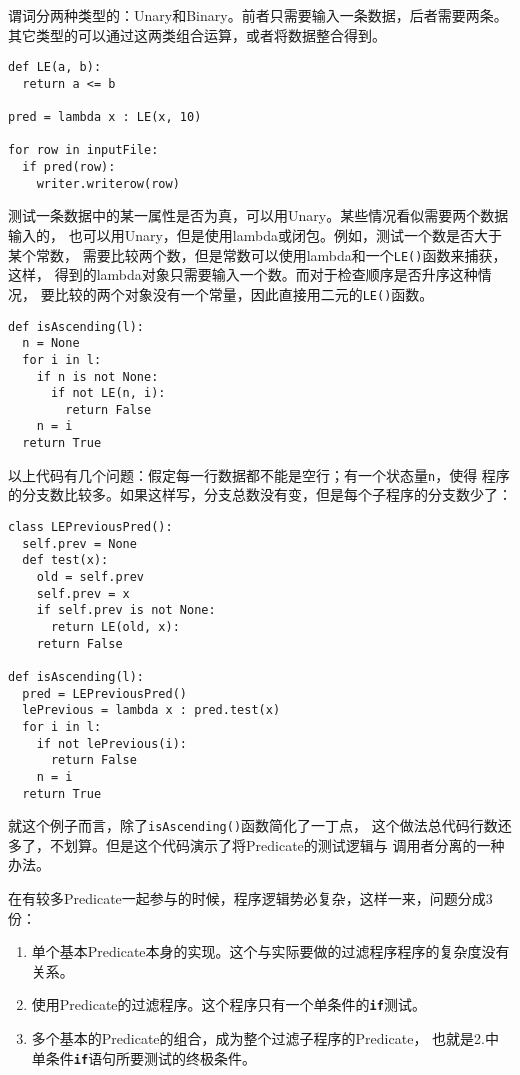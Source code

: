 \documentclass[11pt]{article}
\newcommand{\id}[1]{\texttt{#1}}
\newcommand{\kw}[1]{\texttt{\textbf{#1}}}
\begin{document}
谓词分两种类型的：Unary和Binary。前者只需要输入一条数据，后者需要两条。
其它类型的可以通过这两类组合运算，或者将数据整合得到。
\begin{lstlisting}
def LE(a, b):
  return a <= b

pred = lambda x : LE(x, 10)

for row in inputFile:
  if pred(row):
    writer.writerow(row)
\end{lstlisting}

测试一条数据中的某一属性是否为真，可以用Unary。某些情况看似需要两个数据输入的，
也可以用Unary，但是使用lambda或闭包。例如，测试一个数是否大于某个常数，
需要比较两个数，但是常数可以使用lambda和一个\id{LE()}函数来捕获，这样，
得到的lambda对象只需要输入一个数。而对于检查顺序是否升序这种情况，
要比较的两个对象没有一个常量，因此直接用二元的\id{LE()}函数。
\begin{lstlisting}
def isAscending(l):
  n = None
  for i in l:
    if n is not None:
      if not LE(n, i):
        return False
    n = i
  return True    
\end{lstlisting}

以上代码有几个问题：假定每一行数据都不能是空行；有一个状态量\id{n}，使得
程序的分支数比较多。如果这样写，分支总数没有变，但是每个子程序的分支数少了：
\begin{lstlisting}
class LEPreviousPred():
  self.prev = None
  def test(x):
    old = self.prev
    self.prev = x
    if self.prev is not None:
      return LE(old, x):
    return False
      
def isAscending(l):
  pred = LEPreviousPred()
  lePrevious = lambda x : pred.test(x)
  for i in l:
    if not lePrevious(i):
      return False
    n = i
  return True    
\end{lstlisting}

就这个例子而言，除了\id{isAscending()}函数简化了一丁点，
这个做法总代码行数还多了，不划算。但是这个代码演示了将Predicate的测试逻辑与
调用者分离的一种办法。

在有较多Predicate一起参与的时候，程序逻辑势必复杂，这样一来，问题分成3份：

\begin{enumerate}
  \item 单个基本Predicate本身的实现。这个与实际要做的过滤程序程序的复杂度没有关系。
  \item 使用Predicate的过滤程序。这个程序只有一个单条件的\kw{if}测试。
  \item 多个基本的Predicate的组合，成为整个过滤子程序的Predicate，
  也就是2.中单条件\kw{if}语句所要测试的终极条件。
\end{enumerate}
\end{document}

